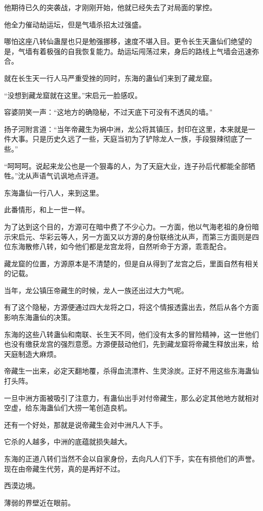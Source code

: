 \begin{this_body}
他期待已久的突袭战，才刚刚开始，他就已经失去了对局面的掌控。

他全力催动劫运坛，但是气墙杀招太过强盛。

哪怕这座八转仙蛊屋也只是勉强挪移，速度不堪入目。更令长生天蛊仙们绝望的是，气墙有着极强的自我恢复能力。劫运坛闯荡过来，身后的路线上气墙会迅速弥合。

就在长生天一行人马严重受挫的同时，东海的蛊仙们来到了藏龙窟。

“没想到藏龙窟就在这里。”宋启元一脸感叹。

容婆阴笑一声：“这地方的确隐秘，不过天底下可没有不透风的墙。”

扬子河附言道：“当年帝藏生为祸中洲，龙公将其镇压，封印在这里，本来就是一件大事。只是历史久远了一些，天庭当初为了铲除龙人一族，手段狠辣彻底了一些。”

“呵呵呵。说起来龙公也是一个狠毒的人，为了天庭大业，连子孙后代都能全部牺牲。”沈从声语气讥讽地点评道。

东海蛊仙一行八人，来到这里。

此番情形，和上一世一样。

为了达到这个目的，方源可在暗中费了不少心力。一方面，他以气海老祖的身份暗示宋启元、华彩云等人，另一方面又以方源的身份联络沈从声，而第三方面则是四位东海散修八转，如今他们都是龙宫龙将，自然听命于方源，乖乖配合。

藏龙窟的位置，方源原本是不清楚的，但是自从得到了龙宫之后，里面自然有相关的记载。

当年，龙公镇压帝藏生的时候，龙人一族还出过大力气呢。

有了这个隐秘，方源便通过四大龙将之口，将这个情报透露出去，然后从各个方面影响东海蛊仙的决策。

东海的这些八转蛊仙和南联、长生天不同，他们没有太多的冒险精神，这一世他们也没有缴获龙宫的强烈意愿。方源便鼓动他们，先到藏龙窟将帝藏生释放出来，给天庭制造大麻烦。

帝藏生一出来，必定天翻地覆，杀得血流漂杵、生灵涂炭。正好不用这些东海蛊仙打头阵。

一旦中洲方面被吸引了注意力，有蛊仙出手对付帝藏生，那么必定其他地方就相对空虚，给东海蛊仙们大捞一笔创造良机。

还有一个好处，那就是说帝藏生会对中洲凡人下手。

它杀的人越多，中洲的底蕴就损失越大。

东海的正道八转们当然不会以自家身份，去向凡人们下手，实在有损他们的声誉。现在由帝藏生代劳，真的是再好不过。

西漠边境。

薄弱的界壁近在眼前。


\end{this_body}

